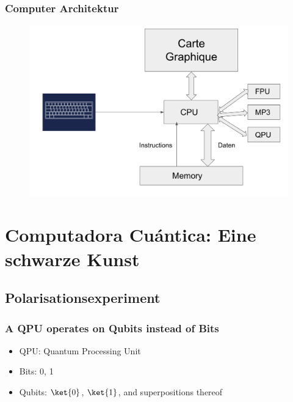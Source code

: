 \documentclass{beamer}
\begin{document}
\begin{frame}
\frametitle{Computer Architektur}
\begin{figure}
\centering
\includegraphics[width=\textwidth]{qpu.png}
\label{qpu}
\end{figure}
\end{frame}

\section{Computadora Cu\'antica: Eine schwarze Kunst}

\subsection{Polarisationsexperiment}

\begin{frame}
\frametitle{A QPU operates on Qubits instead of Bits}
\begin{itemize}
	\item QPU: Quantum Processing Unit
	\item Bits: 0, 1
	\item Qubits: $\ket{0}$, $\ket{1}$, and superpositions thereof
\end{itemize}
\end{frame}
\end{document}
